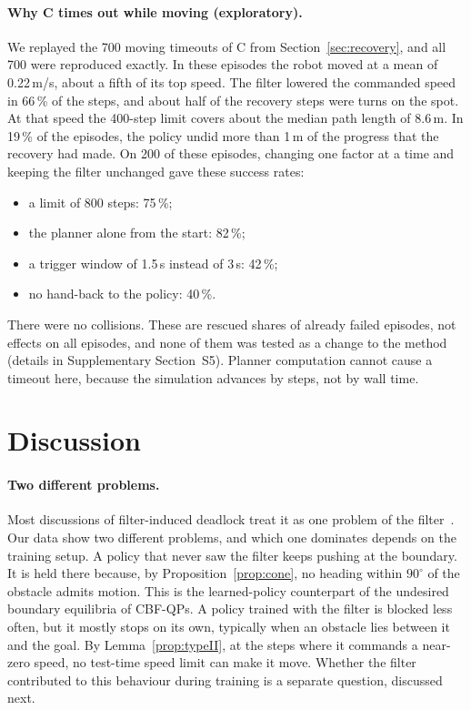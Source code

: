 \documentclass[11pt]{article}
\theoremstyle{definition}
\theoremstyle{remark}
\begin{document}
\paragraph{Why C times out while moving (exploratory).} We replayed the 700 moving timeouts of C from Section~\ref{sec:recovery}, and all 700 were reproduced exactly. In these episodes the robot moved at a mean of 0.22\,m/s, about a fifth of its top speed. The filter lowered the commanded speed in 66\,\% of the steps, and about half of the recovery steps were turns on the spot. At that speed the 400-step limit covers about the median path length of 8.6\,m. In 19\,\% of the episodes, the policy undid more than 1\,m of the progress that the recovery had made. On 200 of these episodes, changing one factor at a time and keeping the filter unchanged gave these success rates:
\begin{itemize}
  \item a limit of 800 steps: 75\,\%;
  \item the planner alone from the start: 82\,\%;
  \item a trigger window of 1.5\,s instead of 3\,s: 42\,\%;
  \item no hand-back to the policy: 40\,\%.
\end{itemize}
There were no collisions. These are rescued shares of already failed episodes, not effects on all episodes, and none of them was tested as a change to the method (details in Supplementary Section~S5). Planner computation cannot cause a timeout here, because the simulation advances by steps, not by wall time.

\section{Discussion}\label{sec:discussion}
\paragraph{Two different problems.} Most discussions of filter-induced deadlock treat it as one problem of the filter~\cite{reis2021undesired,tan2024undesired}. Our data show two different problems, and which one dominates depends on the training setup. A policy that never saw the filter keeps pushing at the boundary. It is held there because, by Proposition~\ref{prop:cone}, no heading within $90^\circ$ of the obstacle admits motion. This is the learned-policy counterpart of the undesired boundary equilibria of CBF-QPs. A policy trained with the filter is blocked less often, but it mostly stops on its own, typically when an obstacle lies between it and the goal. By Lemma~\ref{prop:typeII}, at the steps where it commands a near-zero speed, no test-time speed limit can make it move. Whether the filter contributed to this behaviour during training is a separate question, discussed next.
\end{document}
